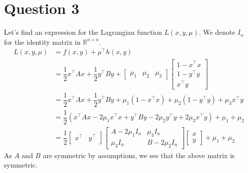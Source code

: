 \documentclass{article}
\newcommand{\R}{\mathbb{R}}
\newcommand{\fxy}{\dfrac{1}{2}x^\top A x + \dfrac{1}{2} y^\top B y}
\newcommand{\hxy}{\begin{bmatrix}
1-x^\top x\\
1-y^\top y\\
x^\top y
\end{bmatrix}}
\begin{document}
\section*{Question 3}
Let's find an expression for the Lagrangian function $L(x,y,\mu)$. We denote $I_n$ for the identity matrix in $\R^{n\times n}$.
\begin{align*}
L(x,y,\mu) &= f(x,y)+\mu^\top h(x,y) \\
&=\fxy  + \begin{bmatrix} \mu_1 &\mu_2 & \mu_3 \end{bmatrix} \hxy \\
&=\fxy + \mu_1(1-x^\top x) +\mu_2(1-y^\top y) + \mu_3 x^\top y \\
&= \dfrac{1}{2}\left(x^\top A x - 2\mu_1 x^\top x +  y^\top B y -2\mu_2 y^\top y + 2\mu_3 x^\top y\right) + \mu_1+\mu_2 \\
&= \dfrac{1}{2} \begin{bmatrix} x^\top & y^\top\end{bmatrix}
\begin{bmatrix} A-2\mu_1 I_n & \mu_3 I_n \\
\mu_3 I_n & B-2\mu_2 I_n \end{bmatrix}
\begin{bmatrix} x \\ y \end{bmatrix} +\mu_1+\mu_2 
\end{align*}
As $A$ and $B$ are symmetric by assumptions, we see that the above matrix is symmetric.
\end{document}
